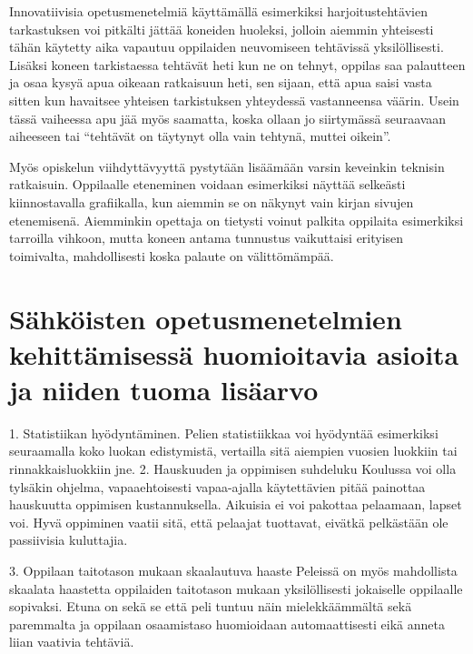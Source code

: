 \documentclass[utf8,bachelor]{gradu3}
\begin{document}
Innovatiivisia opetusmenetelmiä käyttämällä esimerkiksi harjoitustehtävien tarkastuksen voi pitkälti jättää koneiden huoleksi, jolloin aiemmin yhteisesti tähän käytetty aika vapautuu oppilaiden neuvomiseen tehtävissä yksilöllisesti. Lisäksi koneen tarkistaessa tehtävät heti kun ne on tehnyt, oppilas saa palautteen ja osaa kysyä apua oikeaan ratkaisuun heti, sen sijaan, että apua saisi vasta sitten kun havaitsee yhteisen tarkistuksen yhteydessä vastanneensa väärin. Usein tässä vaiheessa apu jää myös saamatta, koska ollaan jo siirtymässä seuraavaan aiheeseen tai “tehtävät on täytynyt olla vain tehtynä, muttei oikein”.

Myös opiskelun viihdyttävyyttä pystytään lisäämään varsin keveinkin teknisin ratkaisuin. Oppilaalle eteneminen voidaan esimerkiksi näyttää selkeästi kiinnostavalla grafiikalla, kun aiemmin se on näkynyt vain kirjan sivujen etenemisenä. Aiemminkin opettaja on tietysti voinut palkita oppilaita esimerkiksi tarroilla vihkoon, mutta koneen antama tunnustus vaikuttaisi erityisen toimivalta, mahdollisesti koska palaute on välittömämpää.

\section{Sähköisten opetusmenetelmien kehittämisessä huomioitavia asioita ja niiden tuoma lisäarvo}


1. Statistiikan hyödyntäminen.
Pelien statistiikkaa voi hyödyntää esimerkiksi seuraamalla koko luokan edistymistä, vertailla sitä aiempien vuosien luokkiin tai rinnakkaisluokkiin jne.
2. Hauskuuden ja oppimisen suhdeluku
	Koulussa voi olla tylsäkin ohjelma, vapaaehtoisesti vapaa-ajalla käytettävien pitää painottaa hauskuutta oppimisen kustannuksella.
Aikuisia ei voi pakottaa pelaamaan, lapset voi. Hyvä oppiminen vaatii sitä, että pelaajat tuottavat, eivätkä pelkästään ole passiivisia kuluttajia. %

3. Oppilaan taitotason mukaan skaalautuva haaste \parencite[][]{koulunArki} \parencite[][13-14]{gamePaper}
Peleissä on myös mahdollista skaalata haastetta oppilaiden taitotason mukaan yksilöllisesti jokaiselle oppilaalle sopivaksi. Etuna on sekä se että peli tuntuu näin mielekkäämmältä sekä paremmalta ja oppilaan osaamistaso huomioidaan automaattisesti eikä anneta liian vaativia tehtäviä.
\end{document}
